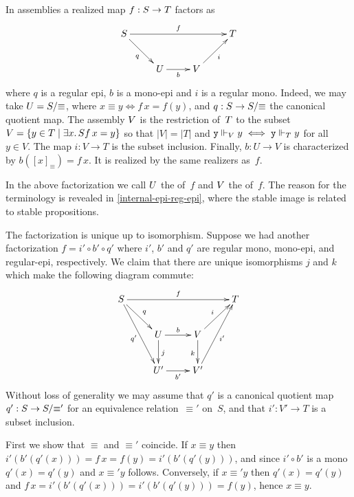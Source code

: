 In assemblies a realized map $f : \asm{S} \to \asm{T}$ factors as
%
\begin{equation*}
  \xymatrix{
    {\asm{S}}
    \ar[rrr]^{f}
    \ar[rd]_{q}
    &
    &
    &
    {\asm{T}}
    \\
    &
    {\asm{U}}
    \ar[r]_{b}
    &
    {\asm{V}}
    \ar[ru]_{i}
    &
  }
\end{equation*}
%
where $q$ is a regular epi, $b$ is a mono-epi and $i$ is a regular
mono. Indeed, we may take $\asm{U} = \asm{S}/{\equiv}$, where $x
\equiv y \iff f\,x = f(y)$, and $q : \asm{S} \to \asm{S}/{\equiv}$ the
canonical quotient map. The assembly $\asm{V}$ is the restriction
of~$\asm{T}$ to the subset $V = \set{y \in T \such \some{x}{S}{f\,x =
    y}}$ so that $|V| = |T|$ and $\R{y} \rz[V] y \iff \R{y} \rz[T] y$
for all $y \in V$. The map $i : V \to T$ is the subset inclusion.
Finally, $b : U \to V$ is characterized by $b([x]_{\equiv}) = f\,x$.
It is realized by the same realizers as~$f$.

In the above factorization we call $\asm{U}$ the  of~$f$
and $\asm{V}$ the  of~$f$. The reason for the
terminology is revealed in \cref{internal-epi-reg-epi}, where
the stable image is related to stable propositions.

The factorization is unique up to isomorphism. Suppose we had another
factorization $f = i' \circ b' \circ q'$ where $i'$, $b'$ and $q'$ are
regular mono, mono-epi, and regular-epi, respectively. We claim that
there are unique isomorphisms $j$ and $k$ which make the following
diagram commute:
%
\begin{equation*}
  \xymatrix{
    {\asm{S}}
    \ar[rrr]^{f}
    \ar[rd]^{q}
    \ar[rdd]_{q'}
    &
    &
    &
    {\asm{T}}
    \\
    &
    {\asm{U}}
    \ar[r]^{b}
    \ar[d]^{j}
    &
    {\asm{V}}
    \ar[ru]^{i}
    \ar[d]_{k}
    &
    \\
    &
    {\asm{U}'}
    \ar[r]_{b'}
    &
    {\asm{V}'}
    \ar[ruu]_{i'}
    &    
  }
\end{equation*}
%
Without loss of generality we may assume that $q'$ is a canonical
quotient map $q' : \asm{S} \to \asm{S}/{\equiv'}$ for an equivalence
relation~$\equiv'$ on~$S$, and that $i' : V' \to T$ is a subset
inclusion.

First we show that $\equiv$ and $\equiv'$ coincide. If $x \equiv y$
then $i'(b'(q'(x))) = f\,x = f(y) = i'(b'(q'(y)))$, and since $i'
\circ b'$ is a mono $q'(x) = q'(y)$ and $x \equiv' y$ follows.
Conversely, if $x \equiv' y$ then $q'(x) = q'(y)$ and $f\,x =
i'(b'(q'(x))) = i'(b'(q'(y))) = f(y)$, hence $x \equiv y$.

